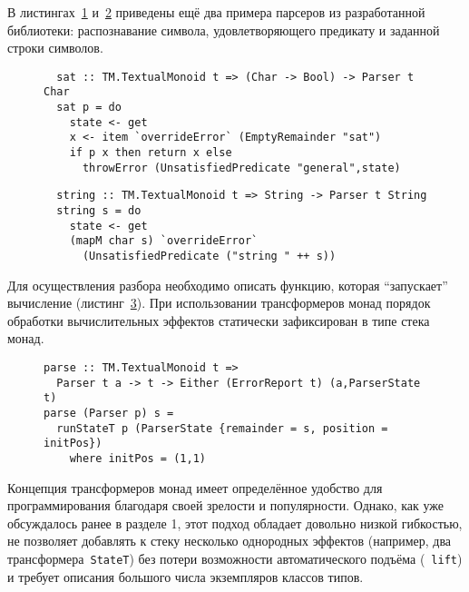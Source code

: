   В листингах~\ref{listing:mtlParserSat} и~\ref{listing:mtlParserString} приведены ещё два примера парсеров из разработанной библиотеки: 
  распознавание символа, удовлетворяющего предикату и заданной строки символов.

  \begin{figure}[h]
  \begin{lstlisting}
  sat :: TM.TextualMonoid t => (Char -> Bool) -> Parser t Char
  sat p = do
    state <- get
    x <- item `overrideError` (EmptyRemainder "sat")
    if p x then return x else 
      throwError (UnsatisfiedPredicate "general",state)
  \end{lstlisting}
  \caption{}
  \label{listing:mtlParserSat}
  \end{figure}

  \begin{figure}[h]
  \begin{lstlisting}
  string :: TM.TextualMonoid t => String -> Parser t String
  string s = do
    state <- get
    (mapM char s) `overrideError` 
      (UnsatisfiedPredicate ("string " ++ s))
  \end{lstlisting}
  \caption{}
  \label{listing:mtlParserString}
  \end{figure}

  Для осуществления разбора необходимо описать функцию, которая ``запускает''
  вычисление (листинг~\ref{listing:mtlParseRun}). При использовании трансформеров 
  монад порядок обработки вычислительных эффектов статически зафиксирован в 
  типе стека монад. 
  
  \begin{figure}[h]
  \begin{lstlisting}
parse :: TM.TextualMonoid t => 
  Parser t a -> t -> Either (ErrorReport t) (a,ParserState t)
parse (Parser p) s = 
  runStateT p (ParserState {remainder = s, position = initPos})
    where initPos = (1,1)
  \end{lstlisting}
  \caption{}
  \label{listing:mtlParseRun}
  \end{figure}


  Концепция трансформеров монад имеет определённое удобство 
  для программирования благодаря своей зрелости и популярности. Однако, как уже
  обсуждалось ранее в разделе 1, этот подход обладает довольно низкой гибкостью, 
  не позволяет добавлять к стеку несколько однородных эффектов (например, два 
  трансформера~\lstinline{StateT}) без потери возможности автоматического 
  подъёма (~\lstinline{lift}) и требует описания большого числа экземпляров классов 
  типов. 


